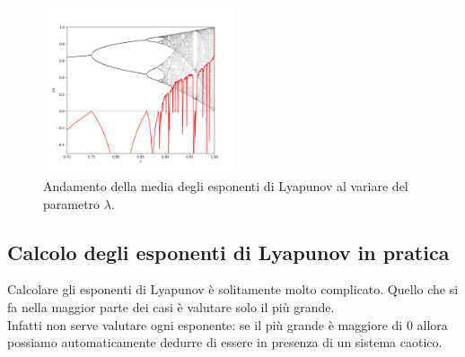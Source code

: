 \begin{figure}[H]
    \centering
    \includegraphics[width=0.5\textwidth]{figures/20_mappa_logistica_lyapunov.png}
    \caption{\scriptsize Andamento della media degli esponenti di Lyapunov al variare del parametro $\lambda$. }
    \label{fig:figures-20_mappa_logistica_lyapunov-png}
\end{figure}
\subsection{Calcolo degli esponenti di Lyapunov in pratica}%
\label{sub:Calcolo degli esponenti di Lyapunov in pratica}
Calcolare gli esponenti di Lyapunov è solitamente molto complicato. Quello che si fa nella maggior parte dei casi è valutare solo il più grande.\\
Infatti non serve valutare ogni esponente: se il più grande è maggiore di $0$ allora possiamo automaticamente dedurre di essere in presenza di un sistema caotico.
